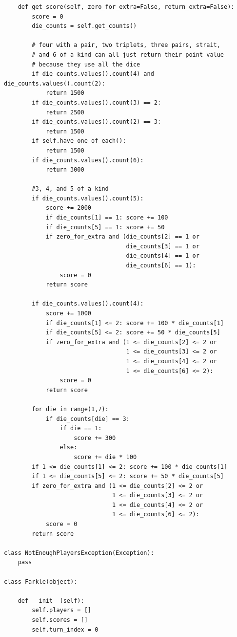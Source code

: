 \documentclass{article}
\begin{document}
\begin{verbatim}
    def get_score(self, zero_for_extra=False, return_extra=False):
        score = 0
        die_counts = self.get_counts()

        # four with a pair, two triplets, three pairs, strait,
        # and 6 of a kind can all just return their point value
        # because they use all the dice
        if die_counts.values().count(4) and die_counts.values().count(2):
            return 1500
        if die_counts.values().count(3) == 2:
            return 2500
        if die_counts.values().count(2) == 3:
            return 1500
        if self.have_one_of_each():
            return 1500
        if die_counts.values().count(6):
            return 3000

        #3, 4, and 5 of a kind
        if die_counts.values().count(5):
            score += 2000
            if die_counts[1] == 1: score += 100
            if die_counts[5] == 1: score += 50
            if zero_for_extra and (die_counts[2] == 1 or
                                   die_counts[3] == 1 or
                                   die_counts[4] == 1 or
                                   die_counts[6] == 1):
                score = 0
            return score

        if die_counts.values().count(4):
            score += 1000
            if die_counts[1] <= 2: score += 100 * die_counts[1]
            if die_counts[5] <= 2: score += 50 * die_counts[5]
            if zero_for_extra and (1 <= die_counts[2] <= 2 or
                                   1 <= die_counts[3] <= 2 or
                                   1 <= die_counts[4] <= 2 or
                                   1 <= die_counts[6] <= 2):
                score = 0
            return score

        for die in range(1,7):
            if die_counts[die] == 3:
                if die == 1:
                    score += 300
                else:
                    score += die * 100
        if 1 <= die_counts[1] <= 2: score += 100 * die_counts[1]
        if 1 <= die_counts[5] <= 2: score += 50 * die_counts[5]
        if zero_for_extra and (1 <= die_counts[2] <= 2 or
                               1 <= die_counts[3] <= 2 or
                               1 <= die_counts[4] <= 2 or
                               1 <= die_counts[6] <= 2):
            score = 0
        return score

class NotEnoughPlayersException(Exception):
    pass

class Farkle(object):

    def __init__(self):
        self.players = []
        self.scores = []
        self.turn_index = 0


\end{verbatim}
\end{document}
